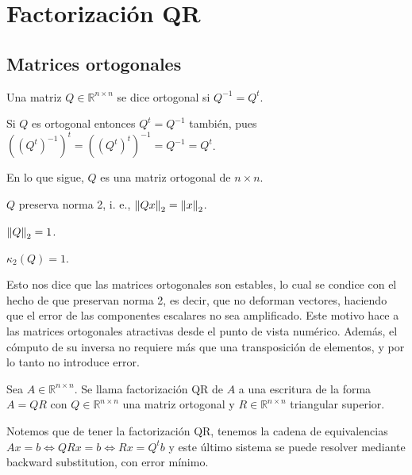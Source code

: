 \section{Factorización QR}

\subsection{Matrices ortogonales}

\begin{defi}
Una matriz $Q \in \mathbb{R}^{n \times n}$ se dice ortogonal si $Q^{-1} = Q^t$.
\end{defi}

\begin{obs}
Si $Q$ es ortogonal entonces $Q^t = Q^{-1}$ también, pues $((Q^t)^{-1})^t = ((Q^t)^t)^{-1} = Q^{-1} = Q^t$.
\end{obs}

En lo que sigue, $Q$ es una matriz ortogonal de $n \times n$.

\begin{lema}
$Q$ preserva norma 2, i. e., $\left\lVert Qx\right\rVert_2 = \left\lVert x\right\rVert_2$.
\end{lema}

\begin{lema}
$\left\lVert Q\right\rVert_2 = 1$.
\end{lema}

\begin{coro}
$\kappa_2(Q) = 1$.
\end{coro}

Esto nos dice que las matrices ortogonales son estables, lo cual se condice con el hecho de que preservan norma 2, es decir, que no deforman vectores, haciendo que el error de las componentes escalares no sea amplificado. Este motivo hace a las matrices ortogonales atractivas desde el punto de vista numérico. Además, el cómputo de su inversa no requiere más que una transposición de elementos, y por lo tanto no introduce error.

\begin{defi}
Sea $A \in \mathbb{R}^{n \times n}$. Se llama factorización QR de $A$ a una escritura de la forma $A = QR$ con $Q \in \mathbb{R}^{n \times n}$ una matriz ortogonal y $R \in \mathbb{R}^{n \times n}$ triangular superior. 
\end{defi}

Notemos que de tener la factorización QR, tenemos la cadena de equivalencias $Ax = b \Leftrightarrow QR x = b \Leftrightarrow Rx = Q^t b$ y este último sistema se puede resolver mediante backward substitution, con error mínimo.

